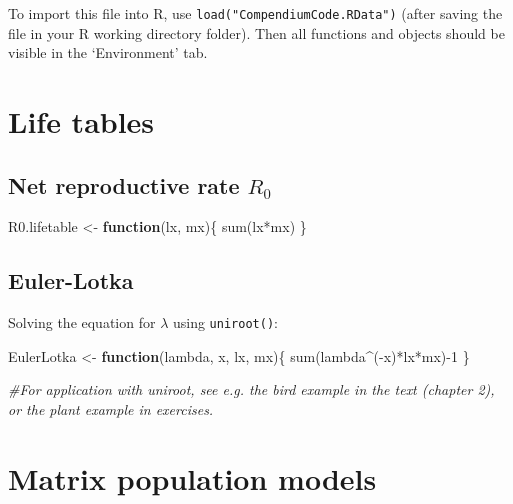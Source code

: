 \documentclass[
]{book}
\newenvironment{Shaded}{\begin{snugshade}}{\end{snugshade}}
\newcommand{\CommentTok}[1]{\textcolor[rgb]{0.56,0.35,0.01}{\textit{#1}}}
\newcommand{\ControlFlowTok}[1]{\textcolor[rgb]{0.13,0.29,0.53}{\textbf{#1}}}
\newcommand{\DecValTok}[1]{\textcolor[rgb]{0.00,0.00,0.81}{#1}}
\newcommand{\FunctionTok}[1]{\textcolor[rgb]{0.00,0.00,0.00}{#1}}
\newcommand{\NormalTok}[1]{#1}
\newcommand{\OtherTok}[1]{\textcolor[rgb]{0.56,0.35,0.01}{#1}}
\newcommand{\SpecialCharTok}[1]{\textcolor[rgb]{0.00,0.00,0.00}{#1}}
\begin{document}
To import this file into R, use \texttt{load("CompendiumCode.RData")} (after saving the file in your R working directory folder). Then all functions and objects should be visible in the `Environment' tab.

\hypertarget{life-tables}{%
\section{Life tables}\label{life-tables}}

\hypertarget{net-reproductive-rate-r_0}{%
\subsection{\texorpdfstring{Net reproductive rate \(R_0\)}{Net reproductive rate R\_0}}\label{net-reproductive-rate-r_0}}

\begin{Shaded}
\begin{Highlighting}[]
\NormalTok{R0.lifetable }\OtherTok{\textless{}{-}} \ControlFlowTok{function}\NormalTok{(lx, mx)\{}
  \FunctionTok{sum}\NormalTok{(lx}\SpecialCharTok{*}\NormalTok{mx) }
\NormalTok{\}}
\end{Highlighting}
\end{Shaded}

\hypertarget{euler-lotka}{%
\subsection{Euler-Lotka}\label{euler-lotka}}

Solving the equation for \(\lambda\) using \texttt{uniroot()}:

\begin{Shaded}
\begin{Highlighting}[]
\NormalTok{EulerLotka }\OtherTok{\textless{}{-}} \ControlFlowTok{function}\NormalTok{(lambda, x, lx, mx)\{}
  \FunctionTok{sum}\NormalTok{(lambda}\SpecialCharTok{\^{}}\NormalTok{(}\SpecialCharTok{{-}}\NormalTok{x)}\SpecialCharTok{*}\NormalTok{lx}\SpecialCharTok{*}\NormalTok{mx)}\SpecialCharTok{{-}}\DecValTok{1}
\NormalTok{\}}

\CommentTok{\#For application with uniroot, see e.g. the bird example in the text (chapter 2), or the plant example in exercises.}
\end{Highlighting}
\end{Shaded}

\hypertarget{matrix-population-models}{%
\section{Matrix population models}\label{matrix-population-models}}
\end{document}
